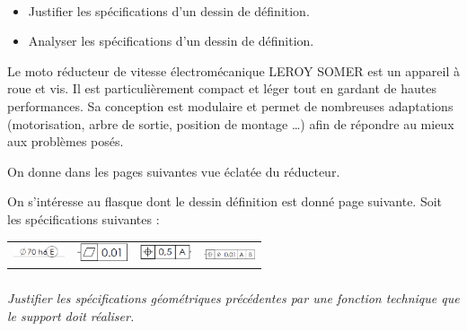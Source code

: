 \documentclass[10pt,fleqn]{article} %
\begin{document}

\vspace{7cm}
\pagestyle{fancy}
\thispagestyle{plain}


\def\columnseprulecolor{\color{ocre}}
\setlength{\columnseprule}{0.4pt} 

\begin{multicols}{2}

\begin{obj}~\\
\begin{itemize}
\item Justifier les spécifications d'un dessin de définition.
\item Analyser les spécifications d'un dessin de définition.
\end{itemize}
\end{obj}

Le moto réducteur de vitesse électromécanique LEROY SOMER  est un appareil à roue et vis. Il est particulièrement compact et léger tout en gardant de hautes performances.
Sa conception est modulaire et permet de nombreuses adaptations (motorisation, arbre de sortie, position de montage …) afin de répondre au mieux aux problèmes posés. 

On donne dans les pages suivantes vue éclatée du réducteur.


On s'intéresse au flasque dont le dessin définition est donné page suivante. 
Soit les spécifications suivantes : 
\begin{center}
\begin{tabular}{cccc}
\includegraphics[width=1.5cm]{images/reducteur_04_a} &
\includegraphics[width=1.5cm]{images/reducteur_04_b} &
\includegraphics[width=1.5cm]{images/reducteur_04_c} &
\includegraphics[width=1.5cm]{images/reducteur_04_d} \\
\end{tabular}
\end{center}

\subparagraph{}\textit{Justifier les spécifications géométriques précédentes par une fonction technique que le support doit réaliser. }


\end{multicols}
\end{document}
